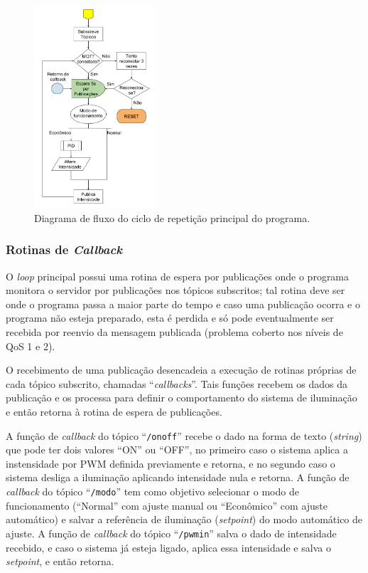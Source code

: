 \begin{figure}[ht]
    \begin{center}
    \includegraphics[width=0.4\textwidth]{figuras/flux_loop.png}
    \end{center}
    \caption[Diagrama de fluxo do ciclo de repetição principal do programa.]{Diagrama de fluxo do ciclo de repetição principal do programa.}
    \label{floop}
\end{figure}

\subsubsection{Rotinas de \textit{Callback}}

O \textit{loop} principal possui uma rotina de espera por publicações onde o programa monitora o servidor por publicações nos tópicos subscritos; tal rotina deve ser onde o programa passa a maior parte do tempo e caso uma publicação ocorra e o programa não esteja preparado, esta é perdida e só pode eventualmente ser recebida por reenvio da mensagem publicada (problema coberto nos níveis de QoS 1 e 2).

O recebimento de uma publicação desencadeia a execução de rotinas próprias de cada tópico subscrito, chamadas ``\textit{callbacks}''. Tais funções recebem os dados da publicação e os processa para definir o comportamento do sistema de iluminação e então retorna à rotina de espera de publicações.

A função de \textit{callback} do tópico ``\texttt{/onoff}'' recebe o dado na forma de texto (\textit{string}) que pode ter dois valores ``ON'' ou ``OFF'', no primeiro caso o sistema aplica a instensidade por PWM definida previamente e retorna, e no segundo caso o sistema desliga a iluminação aplicando intensidade nula e retorna. A função de \textit{callback} do tópico ``\texttt{/modo}'' tem como objetivo selecionar o modo de funcionamento (``Normal'' com ajuste manual ou ``Econômico'' com ajuste automático) e salvar a referência de iluminação (\textit{setpoint}) do modo automático de ajuste. A função de \textit{callback} do tópico ``\texttt{/pwmin}'' salva o dado de intensidade recebido, e caso o sistema já esteja ligado, aplica essa intensidade e salva o \textit{setpoint}, e então retorna.

